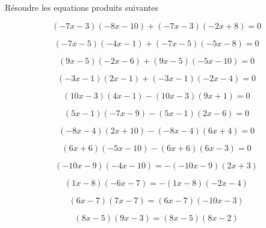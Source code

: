  Résoudre les equations produits suivantes

\begin{multicols}{2}
$$(-7x-3)(-8x-10)+(-7x-3)(-2x+8)=0$$

$$(-7x-5)(-4x-1)+(-7x-5)(-5x-8)=0$$

$$( 9x-5)(-2x-6)+( 9x-5)(-5x-10)=0$$

$$(-3x-1)( 2x-1)+(-3x-1)(-2x-4)=0$$

$$( 10x-3)( 4x-1)-( 10x-3)( 9x+1)=0$$

$$( 5x-1)(-7x-9)-( 5x-1)( 2x-6)=0$$

$$(-8x-4)( 2x+10)-(-8x-4)( 6x+4)=0$$

$$( 6x+6)(-5x-10)-( 6x+6)( 6x-3)=0$$

$$(-10x-9)(-4x-10)=-(-10x-9)( 2x+3)$$

$$( 1x-8)(-6x-7)=-( 1x-8)(-2x-4)$$

$$( 6x-7)( 7x-7)= ( 6x-7)(-10x-3)$$

$$( 8x-5)( 9x-3)= ( 8x-5)( 8x-2)$$

\end{multicols}